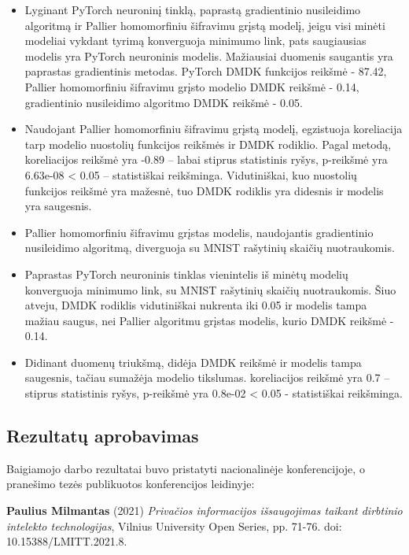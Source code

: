 \documentclass{VUMIFInfBakalaurinis}
\begin{document}
\begin{itemize}
    \item Lyginant PyTorch neuroninį tinklą, paprastą gradientinio nusileidimo algoritmą ir Pallier homomorfiniu šifravimu grįstą modelį, jeigu visi minėti modeliai vykdant tyrimą konverguoja minimumo link, pats saugiausias modelis yra PyTorch neuroninis modelis. Mažiausiai duomenis saugantis yra paprastas gradientinis metodas. PyTorch DMDK funkcijos reikšmė - 87.42, Pallier homomorfiniu šifravimu grįsto modelio DMDK reikšmė - 0.14, gradientinio nusileidimo algoritmo DMDK reikšmė - 0.05.
    \item Naudojant Pallier homomorfiniu šifravimu grįstą modelį, egzistuoja koreliacija tarp modelio nuostolių funkcijos reikšmės ir DMDK rodiklio. Pagal  metodą, koreliacijos reikšmė yra -0.89 -- labai stiprus statistinis ryšys, p-reikšmė yra 6.63e-08 < 0.05 -- statistiškai reikšminga. Vidutiniškai, kuo nuostolių funkcijos reikšmė yra mažesnė, tuo DMDK rodiklis yra didesnis ir modelis yra saugesnis.
    \item Pallier homomorfiniu šifravimu grįstas modelis, naudojantis gradientinio nusileidimo algoritmą, diverguoja su MNIST rašytinių skaičių nuotraukomis.
    \item Paprastas PyTorch neuroninis tinklas vienintelis iš minėtų modelių konverguoja minimumo link, su MNIST rašytinių skaičių nuotraukomis. Šiuo atveju, DMDK rodiklis vidutiniškai nukrenta iki 0.05 ir modelis tampa mažiau saugus, nei Pallier algoritmu grįstas modelis, kurio DMDK reikšmė - 0.14.
    \item Didinant duomenų triukšmą, didėja DMDK reikšmė ir modelis tampa saugesnis, tačiau sumažėja modelio tikslumas.  koreliacijos reikšmė yra 0.7 -- stiprus statistinis ryšys, p-reikšmė yra 0.8e-02 < 0.05 - statistiškai reikšminga.
\end{itemize}

\subsection*{Rezultatų aprobavimas}

\par Baigiamojo darbo rezultatai buvo pristatyti nacionalinėje konferencijoje, o pranešimo tezės publikuotos konferencijos leidinyje:

\item {\bf Paulius Milmantas} (2021) {\it Privačios informacijos išsaugojimas taikant dirbtinio intelekto technologijas}, Vilnius University Open Series, pp. 71-76. doi: 10.15388/LMITT.2021.8.
\end{document}
